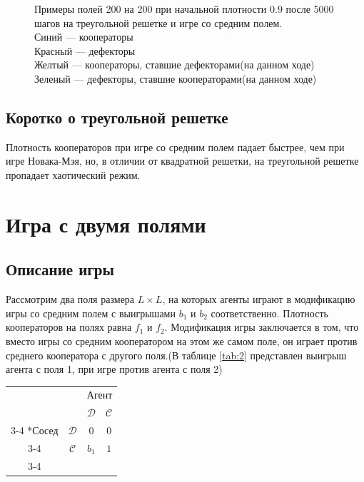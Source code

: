 \documentclass[12pt]{article}
\begin{document}
\begin{figure}[!htbp]
        
        \caption{ Примеры полей 200 на 200 при начальной плотности $0.9$ после 5000 шагов на треугольной решетке и игре со средним полем.\\
        Синий — кооператоры\\
        Красный — дефекторы\\
        Желтый — кооператоры, ставшие дефекторами(на данном ходе)\\
        Зеленый — дефекторы, ставшие кооператорами(на данном ходе)}
        \label{fig:triangfields}
    \end{figure}

\subsection{Коротко о треугольной решетке}
    Плотность кооператоров при игре со средним полем падает быстрее, чем при игре Новака-Мэя, но, в отличии от квадратной решетки, на треугольной решетке пропадает хаотический режим.
    
\section{Игра с двумя полями}
\subsection{Описание игры}
    Рассмотрим два поля размера $L\times L$, на которых агенты играют в модификацию игры со средним полем с выигрышами $b_1$ и $b_2$ соответственно. Плотность кооператоров на полях равна $f_1$ и $f_2$. Модификация игры заключается в том, что вместо игры со средним кооператором на этом же самом поле, он играет против среднего кооператора с другого поля.(В таблице \ref{tab:2} представлен выигрыш агента с поля 1, при игре против агента с поля 2)

  
  \begin{minipage}{\linewidth}
    \centering
     \label{tab:1} 
    \setlength{\extrarowheight}{2pt}
    \begin{tabular}{cc|c|c|}
      & \multicolumn{1}{c}{} & \multicolumn{2}{c}{Агент}\\
      & \multicolumn{1}{c}{} & \multicolumn{1}{c}{$\mathcal{D}$}  & \multicolumn{1}{c}{$\mathcal{C}$} \\\cline{3-4}
      \multirow{2}*{Сосед}  & $\mathcal{D}$ & $0$ & $0$ \\\cline{3-4}
      & $\mathcal{C}$ & $b_1$ & $1$ \\\cline{3-4}
    \end{tabular}
    \end{minipage}
    
\end{document}

